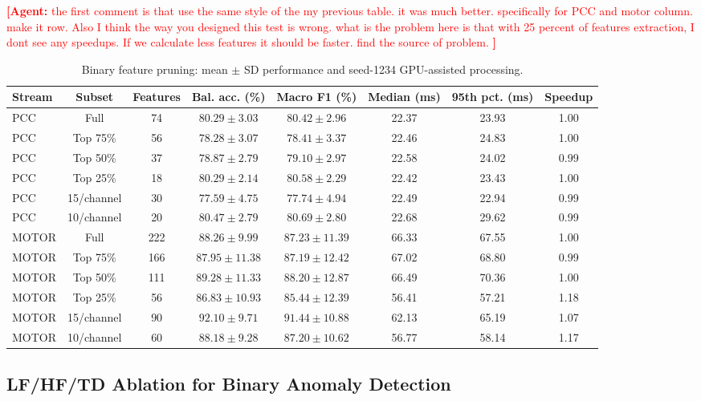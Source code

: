 \documentclass[letterpaper,journal]{IEEEtran}
\newcommand{\agent}[1]{%
    \textcolor{red}{\textbf{[Agent:} #1\textbf{]}}%
}
\begin{document}
\agent{the first comment is that use the same style of the my previous table. it was much better. specifically for PCC and motor column. make it row. Also I think the way you designed this test is wrong. what is the problem here is that with 25 percent of features extraction, I dont see any speedups. If we calculate less features it should be faster. find the source of problem. }
\begin{table}[t]
\centering
\footnotesize
\caption{Binary feature pruning: mean $\pm$ SD performance and seed-1234 GPU-assisted processing.}
\label{tab:feature_pruning_anomaly2_runtime}
\renewcommand{\arraystretch}{1.12}
\setlength{\tabcolsep}{3pt}
\begin{tabular}{lccccccc}
\hline
Stream & Subset & Features & Bal. acc. (\%) & Macro F1 (\%) & Median (ms) & 95th pct. (ms) & Speedup \\
\hline
PCC & Full & 74 & $80.29\pm3.03$ & $80.42\pm2.96$ & 22.37 & 23.93 & 1.00 \\
PCC & Top 75\% & 56 & $78.28\pm3.07$ & $78.41\pm3.37$ & 22.46 & 24.83 & 1.00 \\
PCC & Top 50\% & 37 & $78.87\pm2.79$ & $79.10\pm2.97$ & 22.58 & 24.02 & 0.99 \\
PCC & Top 25\% & 18 & $80.29\pm2.14$ & $80.58\pm2.29$ & 22.42 & 23.43 & 1.00 \\
PCC & 15/channel & 30 & $77.59\pm4.75$ & $77.74\pm4.94$ & 22.49 & 22.94 & 0.99 \\
PCC & 10/channel & 20 & $80.47\pm2.79$ & $80.69\pm2.80$ & 22.68 & 29.62 & 0.99 \\
MOTOR & Full & 222 & $88.26\pm9.99$ & $87.23\pm11.39$ & 66.33 & 67.55 & 1.00 \\
MOTOR & Top 75\% & 166 & $87.95\pm11.38$ & $87.19\pm12.42$ & 67.02 & 68.80 & 0.99 \\
MOTOR & Top 50\% & 111 & $89.28\pm11.33$ & $88.20\pm12.87$ & 66.49 & 70.36 & 1.00 \\
MOTOR & Top 25\% & 56 & $86.83\pm10.93$ & $85.44\pm12.39$ & 56.41 & 57.21 & 1.18 \\
MOTOR & 15/channel & 90 & $92.10\pm9.71$ & $91.44\pm10.88$ & 62.13 & 65.19 & 1.07 \\
MOTOR & 10/channel & 60 & $88.18\pm9.28$ & $87.20\pm10.62$ & 56.77 & 58.14 & 1.17 \\
\hline
\end{tabular}

\end{table}

\subsection{LF/HF/TD Ablation for Binary Anomaly Detection}
\label{sec:lfhf_ablation}
\end{document}
